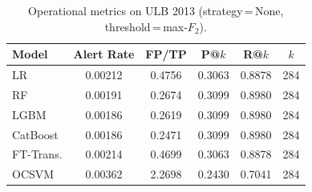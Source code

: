 \begin{table}[H]
\centering
\caption{Operational metrics on ULB 2013 (strategy\,=\,None, threshold\,=\,max-$F_2$).}
\label{tab:ops_ulb}
\begin{tabular}{l c c c c c}
\toprule
Model & Alert Rate & FP/TP & P@$k$ & R@$k$ & $k$ \\
\midrule
LR         & 0.00212 & 0.4756 & 0.3063 & 0.8878 & 284 \\
RF         & 0.00191 & 0.2674 & 0.3099 & 0.8980 & 284 \\
LGBM       & 0.00186 & 0.2619 & 0.3099 & 0.8980 & 284 \\
CatBoost   & 0.00186 & 0.2471 & 0.3099 & 0.8980 & 284 \\
FT-Trans.  & 0.00214 & 0.4699 & 0.3063 & 0.8878 & 284 \\
OCSVM      & 0.00362 & 2.2698 & 0.2430 & 0.7041 & 284 \\
\bottomrule
\end{tabular}
\end{table}
